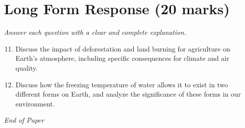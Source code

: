 \documentclass[12pt]{article}
\begin{document}
\section*{Long Form Response (20 marks)}
\textit{Answer each question with a clear and complete explanation.}
\begin{enumerate}[label=\arabic*.]
\setcounter{enumi}{10}
\item Discuss the impact of deforestation and land burning for agriculture on Earth's
atmosphere, including specific consequences for climate and air quality.
\item Discuss how the freezing temperature of water allows it to exist in two different forms on
Earth, and analyze the significance of these forms in our environment.
\end{enumerate}

\vfill
\noindent\textit{End of Paper}
\end{document}
